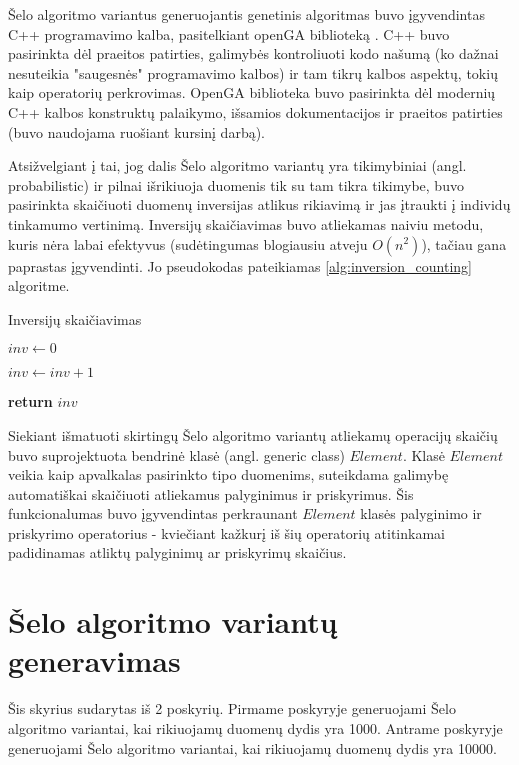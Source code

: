 \documentclass{VUMIFInfKursinis}
\begin{document}
Šelo algoritmo variantus generuojantis genetinis algoritmas buvo įgyvendintas C++ programavimo kalba, pasitelkiant openGA biblioteką \cite{mohammadi2017openga}.
C++ buvo pasirinkta dėl praeitos patirties, galimybės kontroliuoti kodo našumą (ko dažnai nesuteikia "saugesnės" programavimo kalbos)
ir tam tikrų kalbos aspektų, tokių kaip operatorių perkrovimas.
OpenGA biblioteka buvo pasirinkta dėl modernių C++ kalbos konstruktų palaikymo, išsamios dokumentacijos ir praeitos patirties (buvo naudojama ruošiant kursinį darbą).

Atsižvelgiant į tai, jog dalis Šelo algoritmo variantų yra tikimybiniai (angl. probabilistic) ir pilnai išrikiuoja duomenis tik su tam tikra tikimybe,
buvo pasirinkta skaičiuoti duomenų inversijas atlikus rikiavimą ir jas įtraukti į individų tinkamumo vertinimą.
Inversijų skaičiavimas buvo atliekamas naiviu metodu, kuris nėra labai efektyvus (sudėtingumas blogiausiu atveju $O(n^2)$),
tačiau gana paprastas įgyvendinti.
Jo pseudokodas pateikiamas \ref{alg:inversion_counting} algoritme.

\begin{algorithm}[H]
  \caption{Inversijų skaičiavimas}\label{alg:inversion_counting}
  \begin{algorithmic}[1]
    \State $inv \gets 0$

          \State $inv \gets inv+1$
        \EndIf
      \EndFor
    \EndFor

    \State \textbf{return} $inv$
  \end{algorithmic}
\end{algorithm}

Siekiant išmatuoti skirtingų Šelo algoritmo variantų atliekamų operacijų skaičių buvo
suprojektuota bendrinė klasė (angl. generic class) $Element$.
Klasė $Element$ veikia kaip apvalkalas pasirinkto tipo duomenims, suteikdama
galimybę automatiškai skaičiuoti atliekamus palyginimus ir priskyrimus.
Šis funkcionalumas buvo įgyvendintas perkraunant $Element$ klasės palyginimo ir priskyrimo operatorius - kviečiant
kažkurį iš šių operatorių atitinkamai padidinamas atliktų palyginimų ar priskyrimų skaičius.

\section{Šelo algoritmo variantų generavimas}

Šis skyrius sudarytas iš 2 poskyrių.
Pirmame poskyryje generuojami Šelo algoritmo variantai, kai rikiuojamų duomenų dydis yra 1000.
Antrame poskyryje generuojami Šelo algoritmo variantai, kai rikiuojamų duomenų dydis yra 10000.
\end{document}
